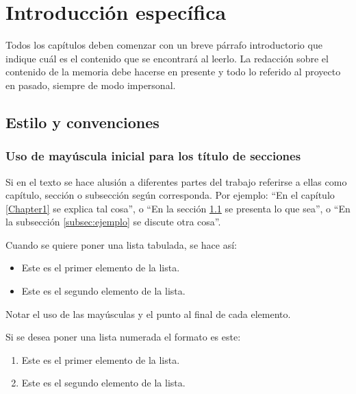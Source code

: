 \chapter{Introducción específica} %

\label{Chapter2}

Todos los capítulos deben comenzar con un breve párrafo introductorio que indique cuál es el contenido que se encontrará al leerlo.  La redacción sobre el contenido de la memoria debe hacerse en presente y todo lo referido al proyecto en pasado, siempre de modo impersonal.

\section{Estilo y convenciones}
\label{sec:ejemplo}

\subsection{Uso de mayúscula inicial para los título de secciones}

Si en el texto se hace alusión a diferentes partes del trabajo referirse a ellas como capítulo, sección o subsección según corresponda. Por ejemplo: ``En el capítulo \ref{Chapter1} se explica tal cosa'', o ``En la sección \ref{sec:ejemplo} se presenta lo que sea'', o ``En la subsección \ref{subsec:ejemplo} se discute otra cosa''.

Cuando se quiere poner una lista tabulada, se hace así:

\begin{itemize}
	\item Este es el primer elemento de la lista.
	\item Este es el segundo elemento de la lista.
\end{itemize}

Notar el uso de las mayúsculas y el punto al final de cada elemento.

Si se desea poner una lista numerada el formato es este:

\begin{enumerate}
	\item Este es el primer elemento de la lista.
	\item Este es el segundo elemento de la lista.
\end{enumerate}

